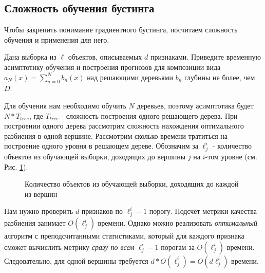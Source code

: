 \documentclass[12pt,fleqn]{article}
\begin{document}
\subsection{Сложность обучения бустинга}

Чтобы закрепить понимание градиентного бустинга, посчитаем сложность обучения и применения для него.

\begin{vkProblem}
Дана выборка из $\ell$ объектов, описываемых $d$ признаками. Приведите временную асимптотику обучения и построения прогнозов для композиции вида $a_N(x) = \sum_{n=0}^N b_n(x)$ над решающими деревьями $b_n$ глубины не более, чем $D$.
\end{vkProblem}
\begin{esSolution}
Для обучения нам необходимо обучить $N$ деревьев, поэтому асимптотика будет $N * T_{tree}$, где $T_{tree}$ - сложность построения одного решающего дерева. При построении одного дерева рассмотрим сложность нахождения оптимального разбиения в одной вершине. Рассмотрим сколько времени тратиться на построение одного уровня в решающем дереве. Обозначим за $\ell^i_j$ - количество объектов из обучающей выборки, доходящих до вершины $j$ на $i$-том уровне (см. Рис. \ref{tree_objects}).

\begin{figure}[!h]
\centering
{}
\caption{Количество объектов из обучающей выборки, доходящих до каждой из вершин}
\label{tree_objects}
\end{figure}

Нам нужно проверить $d$ признаков по $\ell^i_j - 1$ порогу. Подсчёт метрики качества разбиения занимает $O(\ell^i_j)$ времени. Однако можно реализовать \textit{оптимальный} алгоритм с преподсчитанными статистиками, который для каждого признака сможет вычислить метрику \textit{сразу по всем} $\ell^i_j - 1$ порогам за $O(\ell^i_j)$ времени. Следовательно, для одной вершины требуется $d * O(\ell^i_j) = O(d\ell^i_j)$ времени.


\end{esSolution}
\end{document}
